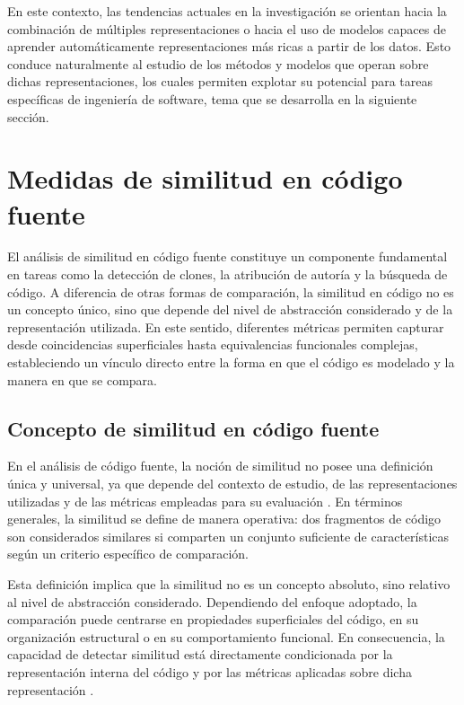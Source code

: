 En este contexto, las tendencias actuales en la investigación se orientan hacia la combinación de múltiples representaciones o hacia el uso de modelos capaces de aprender automáticamente representaciones más ricas a partir de los datos. Esto conduce naturalmente al estudio de los métodos y modelos que operan sobre dichas representaciones, los cuales permiten explotar su potencial para tareas específicas de ingeniería de software, tema que se desarrolla en la siguiente sección.

\section{Medidas de similitud en código fuente}

El análisis de similitud en código fuente constituye un componente fundamental en tareas como la detección de clones, la atribución de autoría y la búsqueda de código. A diferencia de otras formas de comparación, la similitud en código no es un concepto único, sino que depende del nivel de abstracción considerado y de la representación utilizada. En este sentido, diferentes métricas permiten capturar desde coincidencias superficiales hasta equivalencias funcionales complejas, estableciendo un vínculo directo entre la forma en que el código es modelado y la manera en que se compara.

\subsection{Concepto de similitud en código fuente}

En el análisis de código fuente, la noción de similitud no posee una definición única y universal, ya que depende del contexto de estudio, de las representaciones utilizadas y de las métricas empleadas para su evaluación \cite{Roy2007Survey}. En términos generales, la similitud se define de manera operativa: dos fragmentos de código son considerados similares si comparten un conjunto suficiente de características según un criterio específico de comparación\cite{Bellon2007Comparison}.

Esta definición implica que la similitud no es un concepto absoluto, sino relativo al nivel de abstracción considerado. Dependiendo del enfoque adoptado, la comparación puede centrarse en propiedades superficiales del código, en su organización estructural o en su comportamiento funcional. En consecuencia, la capacidad de detectar similitud está directamente condicionada por la representación interna del código y por las métricas aplicadas sobre dicha representación \cite{Lu2026CSSG}.

